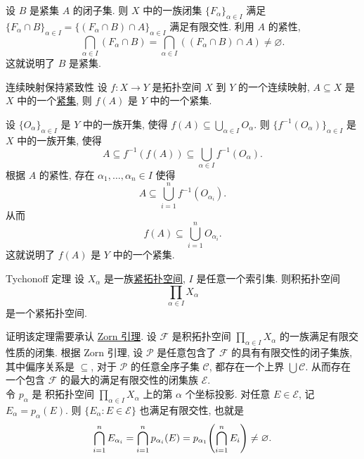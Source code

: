         \begin{prf}
            设 \(B\) 是紧集 \(A\) 的闭子集. 则 \(X\) 中的一族闭集 \(\{F_\alpha\}_{\alpha\in I}\) 满足 \(\{F_\alpha\cap B\}_{\alpha\in I} = \{(F_\alpha\cap B)\cap A\}_{\alpha\in I}\) 满足有限交性. 利用 \(A\) 的紧性, 
            \[\bigcap_{\alpha\in I} (F_\alpha\cap B) = \bigcap_{\alpha\in I} ((F_\alpha\cap B)\cap A) \neq \varnothing.\]
            这就说明了 \(B\) 是紧集.
        \end{prf}

        \begin{varthm}
            {连续映射保持紧致性}
            设 \(f:X\to Y\) 是拓扑空间 \(X\) 到 \(Y\) 的一个连续映射, \(A\subseteq X\) 是 \(X\) 中的一个\hyperref[dfn:compact]{紧集}, 则 \(f(A)\) 是 \(Y\) 中的一个紧集.
        \end{varthm}

        \begin{prf}
            设 \(\{O_\alpha\}_{\alpha\in I}\) 是 \(Y\) 中的一族开集, 使得 \(f(A)\subseteq\bigcup_{\alpha\in I} O_\alpha\). 则 \(\{f^{-1}(O_\alpha)\}_{\alpha\in I}\) 是 \(X\) 中的一族开集, 使得
            \[A\subseteq f^{-1}(f(A)) \subseteq \bigcup_{\alpha\in I} f^{-1}(O_\alpha).\]
            根据 \(A\) 的紧性, 存在 \(\alpha_1,\dots,\alpha_n\in I\) 使得
            \[A\subseteq \bigcup_{i=1}^n f^{-1}(O_{\alpha_i}).\]
            从而
            \[f(A)\subseteq \bigcup_{i=1}^n O_{\alpha_i}.\]
            这就说明了 \(f(A)\) 是 \(Y\) 中的一个紧集.
        \end{prf}

        \begin{varthm}
            [tychonoff]
            {Tychonoff 定理}
            设 \(X_\alpha\) 是一族\hyperref[dfn:compact]{紧拓扑空间}, \(I\) 是任意一个索引集. 则积拓扑空间
            \[\prod_{\alpha\in I} X_\alpha\]
            是一个紧拓扑空间.
        \end{varthm}

        \begin{prf}
            证明该定理需要承认 \hyperref[thm:zorn]{Zorn 引理}. 设 \(\mathscr{F}\) 是积拓扑空间 \(\prod\limits_{\alpha\in I} X_\alpha\) 的一族满足有限交性质的闭集. 根据 Zorn 引理, 设 \(\mathscr{P}\) 是任意包含了 \(\mathscr{F}\) 的具有有限交性的闭子集族, 其中偏序关系是 \(\subseteq\), 对于 \(\mathscr{P}\) 的任意全序子集 \(\mathscr{C}\), 都存在一个上界 \(\bigcup\mathscr{C}\). 从而存在一个包含 \(\mathscr{F}\) 的最大的满足有限交性的闭集族 \(\mathscr{E}\).\\
            令 \(p_\alpha\) 是 积拓扑空间 \(\prod\limits_{\alpha\in I} X_\alpha\) 上的第 \(\alpha\) 个坐标投影. 对任意 \(E\in\mathscr{E}\), 记 \(E_\alpha = p_\alpha(E)\). 则 \(\{E_\alpha:E\in\mathscr{E}\}\) 也满足有限交性, 也就是
            \[\bigcap_{i=1}^n E_{\alpha_i} = \bigcap_{i=1}^n p_{\alpha_i}(E) = p_{\alpha_1}\qty(\bigcap_{i=1}^n E_i)\neq\varnothing.\]
            \bysorry
        \end{prf}

